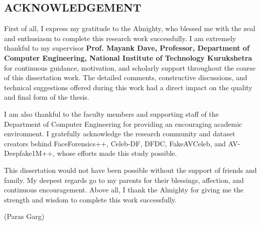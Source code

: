 \begin{center}
	\section*{ACKNOWLEDGEMENT}
	\noindent{\rule{\textwidth}{1.5pt}}
\end{center}
First of all, I express my gratitude to the Almighty, who blessed me with the zeal and enthusiasm to complete this research work successfully. I am extremely thankful to my supervisor \textbf{Prof. Mayank Dave, Professor, Department of Computer Engineering, National Institute of Technology Kurukshetra} for continuous guidance, motivation, and scholarly support throughout the course of this dissertation work. The detailed comments, constructive discussions, and technical suggestions offered during this work had a direct impact on the quality and final form of the thesis.
\par
I am also thankful to the faculty members and supporting staff of the Department of Computer Engineering for providing an encouraging academic environment. I gratefully acknowledge the research community and dataset creators behind FaceForensics++, Celeb-DF, DFDC, FakeAVCeleb, and AV-Deepfake1M++, whose efforts made this study possible.
\par
This dissertation would not have been possible without the support of friends and family. My deepest regards go to my parents for their blessings, affection, and continuous encouragement. Above all, I thank the Almighty for giving me the strength and wisdom to complete this work successfully.
\begin{flushright}
	(Paras Garg)
\end{flushright}
